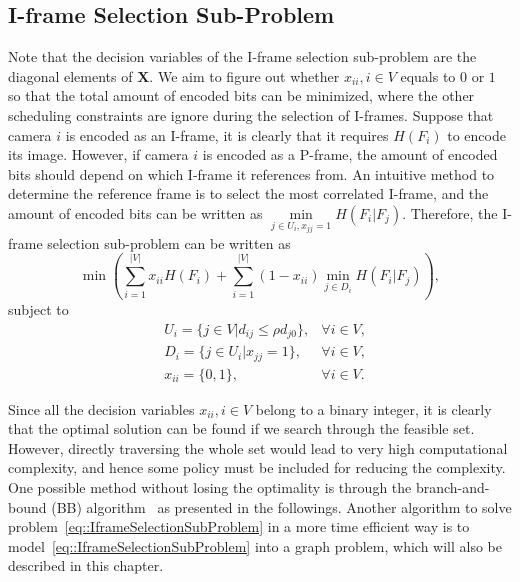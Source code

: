 \subsection{I-frame Selection Sub-Problem}
\label{sec::iFrameSelectionSubProb}
Note that the decision variables of the I-frame selection sub-problem are the diagonal elements of $\mathbf{X}$.
We aim to figure out whether ${x_{ii},i \in V}$ equals to $0$ or $1$ so that the total amount of encoded bits can be minimized, where the other scheduling constraints are ignore during the selection of I-frames.
Suppose that camera $i$ is encoded as an I-frame, it is clearly that it requires $H(F_i)$ to encode its image.
However, if camera $i$ is encoded as a P-frame, the amount of encoded bits should depend on which I-frame it references from.
An intuitive method to determine the reference frame is to select the most correlated I-frame, and the amount of encoded bits can be written as $\underset{j \in U_i, x_{jj}=1}{\min} H(F_i|F_j)$.
Therefore, the I-frame selection sub-problem can be written as
\begin{equation*}
\min \left(
\sum_{i=1}^{|V|} x_{ii}H(F_i) +
\sum_{i=1}^{|V|} (1-x_{ii}) \underset{j \in D_i}{\min} H(F_i|F_j) \right),
\end{equation*}
subject to
\begin{align}
&U_i = \{ j \in V | d_{ij} \leq \rho d_{j0} \}, &\forall i \in V, \nonumber \\
&D_i = \{ j \in U_i| x_{jj} = 1\}, &\forall i \in V, \nonumber \\
&x_{ii} = \{0,1\}, &\forall i \in V.
\label{eq::IframeSelectionSubProblem}
\end{align}

Since all the decision variables ${x_{ii},i \in V}$ belong to a binary integer, it is clearly that the optimal solution can be found if we search through the feasible set.
However, directly traversing the whole set would lead to very high computational complexity, and hence some policy must be included for reducing the complexity.
One possible method without losing the optimality is through the branch-and-bound (BB) algorithm~\cite{BB} as presented in the followings.
Another algorithm to solve problem~\eqref{eq::IframeSelectionSubProblem} in a more time efficient way is to model~\eqref{eq::IframeSelectionSubProblem} into a graph problem, which will also be described in this chapter.
%
